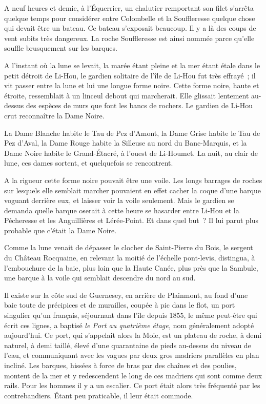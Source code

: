 \documentclass[french,twoside]{book} %
\begin{document}
A neuf heures et demie, à l’Équerrier, un chalutier remportant son filet s’arrêta quelque temps pour considérer entre Colombelle et la Souffleresse quelque chose qui devait être un bateau. Ce bateau s’exposait beaucoup. Il y a là des coups de vent subits très dangereux. La roche Souffleresse est ainsi nommée parce qu’elle souffle brusquement sur les barques.\par
A l’instant où la lune se levait, la marée étant pleine et la mer étant étale dans le petit détroit de Li-Hou, le gardien solitaire de l’île de Li-Hou fut très effrayé ; il vit passer entre la lune et lui une longue forme noire. Cette forme noire, haute et étroite, ressemblait à un linceul debout qui marcherait. Elle glissait lentement au-dessus des espèces de murs que font les bancs de rochers. Le gardien de Li-Hou crut reconnaître la Dame Noire.\par
 La Dame Blanche habite le Tau de Pez d’Amont, la Dame Grise habite le Tau de Pez d’Aval, la Dame Rouge habite la Silleuse au nord du Banc-Marquis, et la Dame Noire habite le Grand-Étacré, à l’ouest de Li-Houmet. La nuit, au clair de lune, ces dames sortent, et quelquefois se rencontrent.\par
A la rigueur cette forme noire pouvait être une voile. Les longs barrages de roches sur lesquels elle semblait marcher pouvaient en effet cacher la coque d’une barque voguant derrière eux, et laisser voir la voile seulement. Mais le gardien se demanda quelle barque oserait à cette heure se hasarder entre Li-Hou et la Pécheresse et les Anguillières et Lérée-Point. Et dans quel but ? Il lui parut plus probable que c’était la Dame Noire.\par
Comme la lune venait de dépasser le clocher de Saint-Pierre du Bois, le sergent du Château Rocquaine, en relevant la moitié de l’échelle pont-levis, distingua, à l’embouchure de la baie, plus loin que la Haute Canée, plus près que la Sambule, une barque à la voile qui semblait descendre du nord au sud.\par
Il existe sur la côte sud de Guernesey, en arrière de Plainmont, au fond d’une baie toute de précipices et de murailles, coupée à pic dans le flot, un port singulier qu’un français, séjournant dans l’île depuis 1855, le même peut-être qui écrit ces lignes, a baptisé \emph{le Port au quatrième étage,} nom généralement adopté aujourd’hui. Ce port, qui s’appelait alors la Moie, est un plateau de roche, à demi naturel, à demi taillé, élevé d’une quarantaine de pieds au-dessus du niveau  de l’eau, et communiquant avec les vagues par deux gros madriers parallèles en plan incliné. Les barques, hissées à force de bras par des chaînes et des poulies, montent de la mer et y redescendent le long de ces madriers qui sont comme deux rails. Pour les hommes il y a un escalier. Ce port était alors très fréquenté par les contrebandiers. Étant peu praticable, il leur était commode.\par
\end{document}
